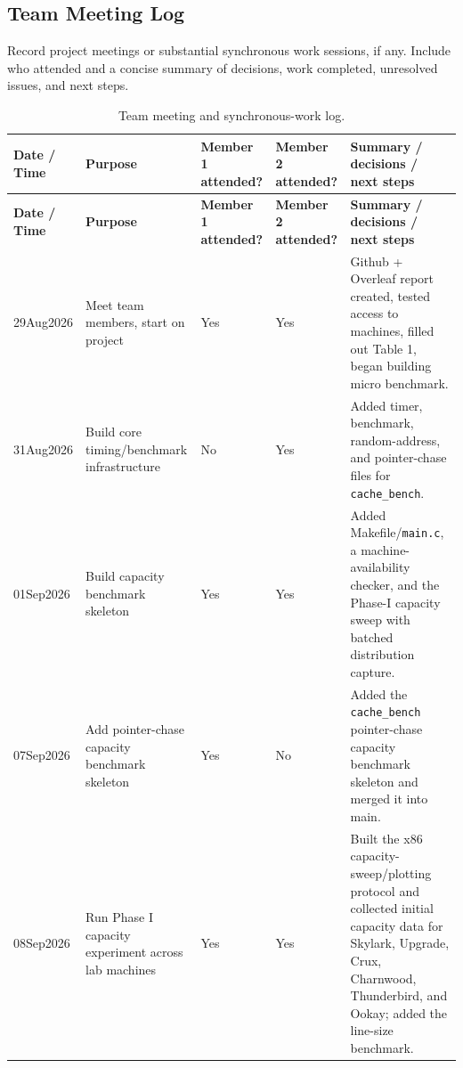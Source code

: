 \documentclass{article}
\begin{document}
\subsection{Team Meeting Log}

Record project meetings or substantial synchronous work sessions, if any. Include who attended and a concise summary of decisions, work completed, unresolved issues, and next steps.

\begin{longtable}{|p{2.5cm}|p{3cm}|p{2cm}|p{2cm}|p{5cm}|}
\caption{Team meeting and synchronous-work log.}
\label{tab:meeting-log} \\

\hline
\textbf{Date / Time} &
\textbf{Purpose} &
\textbf{Member 1 attended?} &
\textbf{Member 2 attended?} &
\textbf{Summary / decisions / next steps} \\
\hline
\endfirsthead

\hline
\textbf{Date / Time} &
\textbf{Purpose} &
\textbf{Member 1 attended?} &
\textbf{Member 2 attended?} &
\textbf{Summary / decisions / next steps} \\
\hline
\endhead

29Aug2026 &
Meet team members, start on project &
Yes &
Yes &
Github + Overleaf report created, tested access to machines, filled out Table 1, began building micro benchmark. \\
\hline

31Aug2026 &
Build core timing/benchmark infrastructure &
No &
Yes &
Added timer, benchmark, random-address, and pointer-chase files for \texttt{cache\_bench}. \\
\hline

01Sep2026 &
Build capacity benchmark skeleton &
Yes &
Yes &
Added Makefile/\texttt{main.c}, a machine-availability checker, and the Phase-I capacity sweep with batched distribution capture. \\
\hline

07Sep2026 &
Add pointer-chase capacity benchmark skeleton &
Yes &
No &
Added the \texttt{cache\_bench} pointer-chase capacity benchmark skeleton and merged it into main. \\
\hline

08Sep2026 &
Run Phase I capacity experiment across lab machines &
Yes &
Yes &
Built the x86 capacity-sweep/plotting protocol and collected initial capacity data for Skylark, Upgrade, Crux, Charnwood, Thunderbird, and Ookay; added the line-size benchmark. \\
\hline


\end{longtable}
\end{document}
